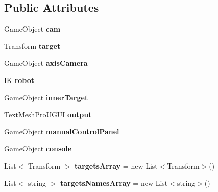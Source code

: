 \subsection*{Public Attributes}
\begin{DoxyCompactItemize}
\item 
\mbox{\label{class_game_controller_acf4255ac9eb373729c1d699e590eeab6}} 
Game\+Object {\bfseries cam}
\item 
\mbox{\label{class_game_controller_aa2c4c0f2bfdcab6bccb58d8b9178363c}} 
Transform {\bfseries target}
\item 
\mbox{\label{class_game_controller_a7a8eac3f9ff9b273bd04958809a6a1d7}} 
Game\+Object {\bfseries axis\+Camera}
\item 
\mbox{\label{class_game_controller_aa872b7fe4e38bf7927528476ec362ef7}} 
\mbox{\hyperlink{class_i_k}{IK}} {\bfseries robot}
\item 
\mbox{\label{class_game_controller_abc89f5e71e891c365ba16876980bfa9f}} 
Game\+Object {\bfseries inner\+Target}
\item 
\mbox{\label{class_game_controller_a05f635840a720986531ce51c2025e215}} 
Text\+Mesh\+Pro\+U\+G\+UI {\bfseries output}
\item 
\mbox{\label{class_game_controller_ac41af980d38fdb0e9a0f4aba99c05cd1}} 
Game\+Object {\bfseries manual\+Control\+Panel}
\item 
\mbox{\label{class_game_controller_adac299ab445a53360ac0e63645b0ff50}} 
Game\+Object {\bfseries console}
\item 
\mbox{\label{class_game_controller_acfd64c250f39422f45f2f65128e6dc52}} 
List$<$ Transform $>$ {\bfseries targets\+Array} = new List$<$Transform$>$()
\item 
\mbox{\label{class_game_controller_a2fb6a009700146a476104f11323756ba}} 
List$<$ string $>$ {\bfseries targets\+Names\+Array} = new List$<$string$>$()

\end{DoxyCompactItemize}
